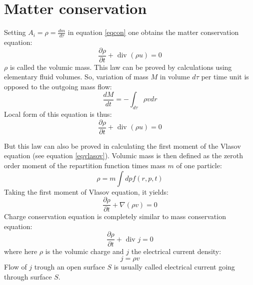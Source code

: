 \documentclass[12pt]{book}
\begin{document}
\section{Matter conservation}
Setting $A_i=\rho=\frac{dm}{d\tau}$ in equation \ref{eqcon} one obtains the
matter conservation equation: 
\begin{equation}
\frac{\partial \rho}{\partial t}+\mbox{ div } (\rho u)=0
\end{equation}
$\rho$ is called the volumic mass.
This law can be proved by calculations using elementary fluid volumes. So,
variation of mass $M$ in volume $d\tau$ per time unit is opposed to the
outgoing mass flow:
\begin{equation}
\frac{dM}{dt}=-\int_{d\tau} \rho v dr
\end{equation}
Local form of this equation is thus:
\begin{equation}
\frac{\partial \rho}{\partial t}+\mbox{ div } (\rho u)=0
\end{equation}

But this law can also be proved in calculating the first moment of the Vlasov
equation (see equation \ref{eqvlasov}). Volumic mass is then defined as the
zeroth order moment of the repartition function times mass $m$ of one particle:
\begin{equation}
\rho=m\int dpf(r,p,t)
\end{equation}
Taking the first moment of Vlasov equation, it yields:
\begin{equation}
\frac{\partial \rho}{\partial t}+\nabla (\rho v)=0
\end{equation}
Charge conservation equation is completely similar to mass conservation
equation:
\begin{equation}
\frac{\partial \rho}{\partial t}+\mbox{ div }{j}=0
\end{equation}
where here $\rho$ is the volumic charge and  $j$ the electrical current
density: 
\begin{equation}
j=\rho v
\end{equation}
Flow of $j$ trough an open surface $S$ is usually called electrical current
going through surface $S$.
\end{document}
